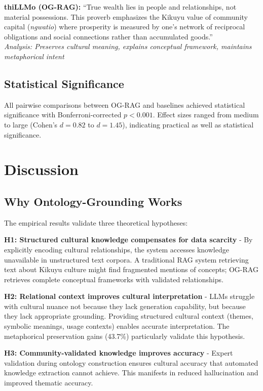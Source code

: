 \documentclass[a4paper,11pt]{article}
\begin{document}
\textbf{thiLLMo (OG-RAG):} ``True wealth lies in people and relationships, not material possessions. This proverb emphasizes the Kikuyu value of community capital (\emph{ngwatio}) where prosperity is measured by one's network of reciprocal obligations and social connections rather than accumulated goods.'' \\
\textit{Analysis: Preserves cultural meaning, explains conceptual framework, maintains metaphorical intent}

\subsection{Statistical Significance}

All pairwise comparisons between OG-RAG and baselines achieved statistical significance with Bonferroni-corrected $p < 0.001$. Effect sizes ranged from medium to large (Cohen's $d = 0.82$ to $d = 1.45$), indicating practical as well as statistical significance.

\section{Discussion}

\subsection{Why Ontology-Grounding Works}

The empirical results validate three theoretical hypotheses:

\textbf{H1: Structured cultural knowledge compensates for data scarcity} - By explicitly encoding cultural relationships, the system accesses knowledge unavailable in unstructured text corpora. A traditional RAG system retrieving text about Kikuyu culture might find fragmented mentions of concepts; OG-RAG retrieves complete conceptual frameworks with validated relationships.

\textbf{H2: Relational context improves cultural interpretation} - LLMs struggle with cultural nuance not because they lack generation capability, but because they lack appropriate grounding. Providing structured cultural context (themes, symbolic meanings, usage contexts) enables accurate interpretation. The metaphorical preservation gains (43.7\%) particularly validate this hypothesis.

\textbf{H3: Community-validated knowledge improves accuracy} - Expert validation during ontology construction ensures cultural accuracy that automated knowledge extraction cannot achieve. This manifests in reduced hallucination and improved thematic accuracy.
\end{document}

